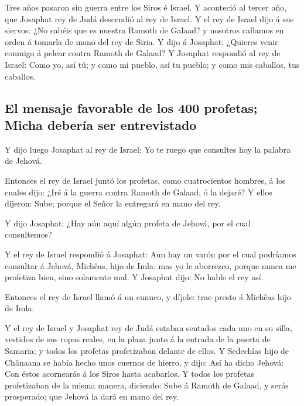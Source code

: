  Tres años pasaron sin guerra entre los Siros é Israel.
 Y aconteció al tercer año, que Josaphat rey de Judá
descendió al rey de Israel.  Y el rey de Israel dijo á sus
siervos: ¿No sabéis que es nuestra Ramoth de Galaad? y nosotros callamos
en orden á tomarla de mano del rey de Siria.  Y dijo á
Josaphat: ¿Quieres venir conmigo á pelear contra Ramoth de Galaad? Y
Josaphat respondió al rey de Israel: Como yo, así tú; y como mi pueblo,
así tu pueblo; y como mis caballos, tus caballos.

\hypertarget{el-mensaje-favorable-de-los-400-profetas-micha-deberuxeda-ser-entrevistado}{%
\subsection{El mensaje favorable de los 400 profetas; Micha debería ser
entrevistado}\label{el-mensaje-favorable-de-los-400-profetas-micha-deberuxeda-ser-entrevistado}}

 Y dijo luego Josaphat al rey de Israel: Yo te ruego que
consultes hoy la palabra de Jehová.

 Entonces el rey de Israel juntó los profetas, como
cuatrocientos hombres, á los cuales dijo: ¿Iré á la guerra contra Ramoth
de Galaad, ó la dejaré? Y ellos dijeron: Sube; porque el Señor la
entregará en mano del rey.

 Y dijo Josaphat: ¿Hay aún aquí algún profeta de Jehová,
por el cual consultemos?

 Y el rey de Israel respondió á Josaphat: Aun hay un varón
por el cual podríamos consultar á Jehová, Michêas, hijo de Imla: mas yo
le aborrezco, porque nunca me profetiza bien, sino solamente mal. Y
Josaphat dijo: No hable el rey así.

 Entonces el rey de Israel llamó á un eunuco, y díjole:
trae presto á Michêas hijo de Imla.

 Y el rey de Israel y Josaphat rey de Judá estaban
sentados cada uno en su silla, vestidos de sus ropas reales, en la plaza
junto á la entrada de la puerta de Samaria; y todos los profetas
profetizaban delante de ellos.  Y Sedechîas hijo de
Chânaana se había hecho unos cuernos de hierro, y dijo: Así ha dicho
Jehová: Con éstos acornearás á los Siros hasta acabarlos.
 Y todos los profetas profetizaban de la misma manera,
diciendo: Sube á Ramoth de Galaad, y serás prosperado; que Jehová la
dará en mano del rey.


